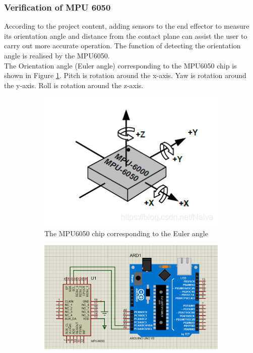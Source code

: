 \subsubsection{Verification of MPU 6050}
According to the project content, adding sensors to the end effector to measure its orientation angle and distance 
from the contact plane can assist the user to carry out more accurate operation. The function of detecting the 
orientation angle is realised by the MPU6050. \\
The Orientation angle (Euler angle) corresponding to the MPU6050 chip is shown in Figure \ref{fig:mpu6050_chip}. 
Pitch is rotation around the x-axis. Yaw is rotation around the y-axis. Roll is rotation around the z-axis. 
\begin{figure}[H] %
    \centering
    \captionsetup{labelsep=colon}
    \begin{subfigure}{0.45\textwidth} %
        \centering
        \includegraphics[width=\linewidth]{Image/Design/MPU6050_chip.png}
        \caption{\centering The MPU6050 chip corresponding to the Euler angle}
        \label{fig:mpu6050_chip}
    \end{subfigure}
    \begin{subfigure}{0.45\textwidth} %
        \centering
        \includegraphics[width=\linewidth]{Image/Design/MPU6050_circuit.png}

\end{subfigure}
\end{figure}
